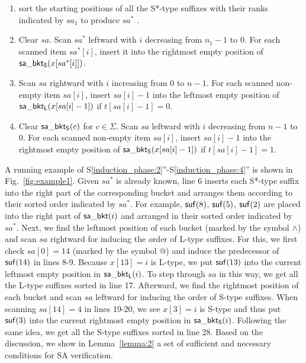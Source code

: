 \documentclass[10pt,journal,compsoc]{IEEEtran}
\begin{document}
\begin{enumerate}[S1'']
	\item sort the starting positions of all the S*-type suffixes with their ranks indicated by $sa_1$ to produce $sa^*$ \label{induction_phase:1}.

	\item Clear $sa$. Scan $sa^*$ leftward with $i$ decreasing from $n_1 - 1$ to $0$. For each scanned item $sa^*[i]$, insert it into the rightmost empty position of ${\sf sa\_bkt_S}(x[sa^*[i]])$. \label{induction_phase:2}
	
	\item Scan $sa$ rightward with $i$ increasing from $0$ to $n - 1$. For each scanned non-empty item $sa[i]$, insert $sa[i] - 1$ into the leftmost empty position of ${\sf sa\_bkt_L}(x[sa[i] - 1])$ if $t[sa[i] - 1] = 0$.\label{induction_phase:3}
	
	\item Clear ${\sf sa\_bkt_S}(c)$ for $c \in \Sigma$. Scan $sa$ leftward with $i$ decreasing from $n - 1$ to $0$. For each scanned non-empty item $sa[i]$, insert $sa[i] - 1$ into the rightmost empty position of ${\sf sa\_bkt_S}(x[sa[i] - 1])$ if $t[sa[i] - 1] = 1$.\label{induction_phase:4}
	
\end{enumerate}

A running example of S\ref{induction_phase:2}''-S\ref{induction_phase:4}'' is shown in Fig.~\ref{fig:example1}. Given $sa^*$ is already known, line 6 inserts each S*-type suffix into the right part of the corresponding bucket and arranges them according to their sorted order indicated by $sa^*$. For example, ${\sf suf}(8)$, ${\sf suf}(5)$, ${\sf suf}(2)$ are placed into the right part of ${\sf sa\_bkt}(i)$ and arranged in their sorted order indicated by $sa^*$. Next, we find the leftmost position of each bucket (marked by the symbol $\wedge$) and scan $sa$ rightward for inducing the order of L-type suffixes. For this, we first check $sa[0] = 14$ (marked by the symbol @) and induce the predecessor of ${\sf suf}(14)$ in lines 8-9. Because $x[13] = i$ is L-type, we put ${\sf suf}(13)$ into the current leftmost empty position in ${\sf sa\_bkt_L}(i)$. To step through $sa$ in this way, we get all the L-type suffixes sorted in line 17. Afterward, we find the rightmost position of each bucket and scan $sa$ leftward for inducing the order of S-type suffixes. When scanning $sa[14] = 4$ in lines 19-20, we see $x[3] = i$ is S-type and thus put ${\sf suf}(3)$ into the current rightmost empty position in ${\sf sa\_bkt_S}(i)$. Following the same idea, we get all the S-type suffixes sorted in line 28. Based on the discussion, we show in Lemma~\ref{lemma:2} a set of sufficient and necessary conditions for SA verification.
\end{document}
